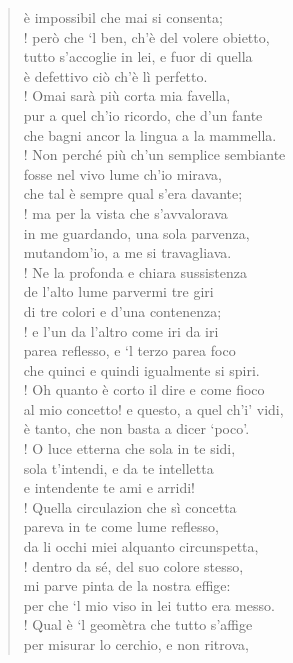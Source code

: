 \documentclass[a4paper, twoside, titlepage]{book}
\begin{document}
\begin{verse}
è impossibil che mai si consenta;\\!
però che ‘l ben, ch’è del volere obietto,\\
tutto s’accoglie in lei, e fuor di quella\\
è defettivo ciò ch’è lì perfetto.\\!
Omai sarà più corta mia favella,\\
pur a quel ch’io ricordo, che d’un fante\\
che bagni ancor la lingua a la mammella.\\!
Non perché più ch’un semplice sembiante\\
fosse nel vivo lume ch’io mirava,\\
che tal è sempre qual s’era davante;\\!
ma per la vista che s’avvalorava\\
in me guardando, una sola parvenza,\\
mutandom’io, a me si travagliava.\\!
Ne la profonda e chiara sussistenza\\
de l’alto lume parvermi tre giri\\
di tre colori e d’una contenenza;\\!
e l’un da l’altro come iri da iri\\
parea reflesso, e ‘l terzo parea foco\\
che quinci e quindi igualmente si spiri.\\!
Oh quanto è corto il dire e come fioco\\
al mio concetto! e questo, a quel ch’i’ vidi,\\
è tanto, che non basta a dicer ‘poco’.\\!
O luce etterna che sola in te sidi,\\
sola t’intendi, e da te intelletta\\
e intendente te ami e arridi!\\!
Quella circulazion che sì concetta\\
pareva in te come lume reflesso,\\
da li occhi miei alquanto circunspetta,\\!
dentro da sé, del suo colore stesso,\\
mi parve pinta de la nostra effige:\\
per che ‘l mio viso in lei tutto era messo.\\!
Qual è ‘l geomètra che tutto s’affige\\
per misurar lo cerchio, e non ritrova,\\

\end{verse}
\end{document}
